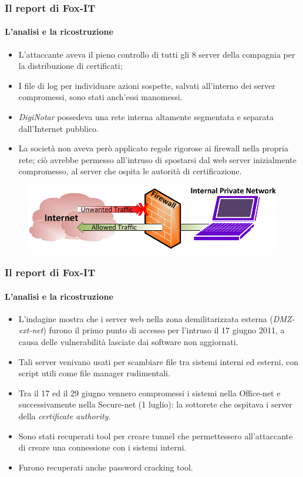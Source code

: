 \documentclass{beamer}
\begin{document}
\begin{frame}
\frametitle{Il report di Fox-IT}
\framesubtitle{L'analisi e la ricostruzione}
\begin{itemize}
	\item L'attaccante aveva il \alert{pieno controllo} di tutti gli 8 \alert{server} della compagnia per la distribuzione di certificati;
	\item I \alert{file di log} per individuare azioni sospette, salvati all'interno dei server compromessi, sono stati anch'essi \alert{manomessi}.
	\item \textit{DigiNotar} possedeva una \alert{rete} interna altamente \alert{segmentata} e separata dall'Internet pubblico.
	\item La società \alert{non aveva} però applicato \alert{regole rigorose} ai \alert{firewall} nella propria rete; ciò avrebbe permesso all'intruso di spostarsi dal web server inizialmente compromesso, al server che ospita le autorità di certificazione.
\end{itemize}
\begin{figure}[H]
	\centering
	\includegraphics[scale=0.23]{firewall}
\end{figure}
\end{frame}

\begin{frame}
\frametitle{Il report di Fox-IT}
\framesubtitle{L'analisi e la ricostruzione}
\begin{itemize}
	\item L'indagine mostra che i server web nella \alert{zona demilitarizzata esterna} (\textit{DMZ-ext-net}) furono il \alert{primo punto di accesso} per l'intruso il 17 giugno 2011, a causa delle vulnerabilità lasciate dai software non aggiornati.
	\item Tali server venivano usati per \alert{scambiare file} tra sistemi interni ed esterni, con script utili come file manager rudimentali.
	\item Tra il 17 ed il 29 giugno vennero compromessi i sistemi nella \alert{Office-net} e successivamente nella \alert{Secure-net} (1 luglio): la sottorete che ospitava i server della \textit{certificate authority}.
	\item Sono stati recuperati \alert{tool} per \alert{creare tunnel} che permettessero all'attaccante di creare una connessione con i sistemi interni.
	\item Furono recuperati anche \alert{password cracking tool}.
\end{itemize}
\end{frame}
\end{document}

